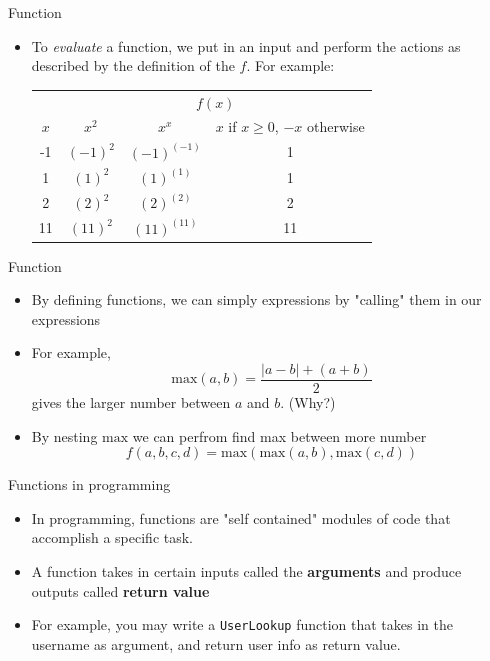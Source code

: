 \documentclass[10pt,xcolor={table,dvipsnames},t]{beamer}
\begin{document}
\begin{frame}{Function}
  \begin{itemize}
    \item To \textit{evaluate} a function, we put in an input and perform the actions as described by the definition of the $f$. For example:
    \begin{table}[]
      \begin{tabular}{cccc}
                               & \multicolumn{3}{c}{$f(x)$}                                                                            \\ \cline{2-4} 
      \multicolumn{1}{c|}{$x$} & \multicolumn{1}{c|}{$x^2$}    & \multicolumn{1}{c|}{$x^x$}         & $x$ if $x\geq 0$, $-x$ otherwise \\ \hline
      \multicolumn{1}{c|}{-1}  & \multicolumn{1}{c|}{$(-1)^2$} & \multicolumn{1}{c|}{$(-1)^{(-1)}$} & 1                                \\ \cline{1-1}
      \multicolumn{1}{c|}{1}   & \multicolumn{1}{c|}{$(1)^2$}  & \multicolumn{1}{c|}{$(1)^{(1)}$}   & 1                                \\ \cline{1-1}
      \multicolumn{1}{c|}{2}   & \multicolumn{1}{c|}{$(2)^2$}  & \multicolumn{1}{c|}{$(2)^{(2)}$}   & 2                                \\ \cline{1-1}
      \multicolumn{1}{c|}{11}  & \multicolumn{1}{c|}{$(11)^2$} & \multicolumn{1}{c|}{$(11)^{(11)}$} & 11                              
      \end{tabular}
      \end{table}
  \end{itemize}
\end{frame}

\begin{frame}{Function}
  \begin{itemize}
    \item By defining functions, we can simply expressions by "calling" them in our expressions 
    \item For example, 
    $$\text{max}(a,b) = \frac{|a-b|+(a+b)}{2}$$
    gives the larger number between $a$ and $b$. (Why?)
    \item By nesting $\text{max}$ we can perfrom find max between more number
    $$f(a,b,c,d) = \text{max}(\text{max}(a,b),\text{max}(c,d))$$
  \end{itemize}
\end{frame}

\begin{frame}{Functions in programming}
  \begin{itemize}
    \item In programming, functions are "self contained" modules of code that accomplish a specific task.
    \item A function takes in certain inputs called the \textbf{arguments} and produce outputs called \textbf{return value}
    \item For example, you may write a \texttt{UserLookup} function that takes in the username as argument, and return user info as return value.
  \end{itemize}
\end{frame}
\end{document}
